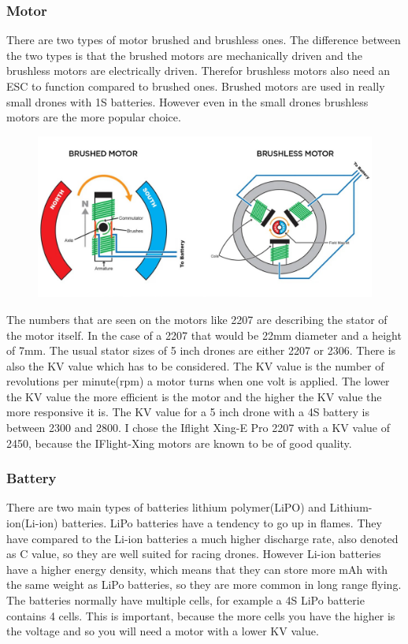 \documentclass{article}
\begin{document}
	\subsubsection{Motor}
	There are two types of motor brushed and brushless ones. The difference between the two types is that the brushed motors are mechanically driven and the brushless motors are electrically driven. Therefor brushless motors also need an ESC to function compared to brushed ones. Brushed motors are used in really small drones with 1S batteries. However even in the small drones brushless motors are the more popular choice\cite{brush/lessmotors}. 
\begin{figure}[h]
	\centering
	\includegraphics[scale=0.2]{pictures/motor}
	\caption{\cite{picturemotor}}
	\label{fig:motor}
\end{figure}

	The numbers that are seen on the motors like 2207 are describing the stator of the motor itself. In the case of a 2207 that would be 22mm diameter and a height of 7mm. The usual stator sizes of 5 inch drones are either 2207 or 2306. There is also the KV value which has to be considered. The KV value is the number of revolutions per minute(rpm) a motor turns when one volt is applied. The lower the KV value the more efficient is the motor and the higher the KV value the more responsive it is. The KV value for a 5 inch drone with a 4S battery is between 2300 and 2800. I chose the Iflight Xing-E Pro 2207\cite{xingepro} with a KV value of 2450, because the IFlight-Xing motors are known to be of good quality. 


	
	\subsubsection{Battery}
	There are two main types of batteries lithium polymer(LiPO) and Lithium-ion(Li-ion) batteries. LiPo batteries have a tendency to go up in flames. They have compared to the Li-ion batteries a much higher discharge rate, also denoted as C value, so they are well suited for racing drones. However Li-ion batteries have a higher energy density, which means that they can store more mAh with the same weight as LiPo batteries, so they are more common in long range flying. The batteries normally have multiple cells, for example a 4S LiPo batterie contains 4 cells. This is important, because the more cells you have the higher is the voltage and so you will need a motor with a lower KV value. 
	
\end{document}
